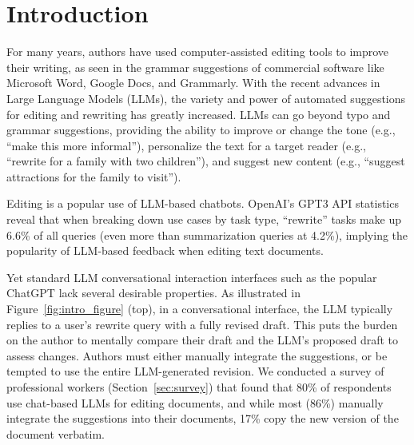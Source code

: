 \documentclass[manuscript]{acmart}
\begin{document}

\maketitle

\section{Introduction}

For many years, authors have used computer-assisted editing tools to improve their writing, as seen in the grammar suggestions of commercial software like Microsoft Word, Google Docs, and Grammarly. With the recent advances in Large Language Models (LLMs), the variety and power of automated suggestions for editing and rewriting has greatly increased. LLMs can go beyond typo and grammar suggestions, providing the ability to improve or change the tone (e.g., ``make this more informal''), personalize the text for a target reader (e.g., ``rewrite for a family with two children''), and suggest new content (e.g., ``suggest attractions for the family to visit''). 

Editing is a popular use of LLM-based chatbots. OpenAI's GPT3 API statistics \cite{ouyang2022training} reveal that when breaking down use cases by task type, ``rewrite'' tasks make up 6.6\% of all queries (even more than summarization queries at 4.2\%), implying the popularity of LLM-based feedback when editing text documents.

Yet standard LLM conversational interaction interfaces such as the popular ChatGPT lack several desirable properties. As illustrated in Figure~\ref{fig:intro_figure} (top), in a conversational interface, the LLM typically replies to a user's rewrite query with a fully revised draft.
This puts the burden on the author to mentally compare their draft and the LLM's proposed draft to assess changes. 
Authors must either manually integrate the suggestions, or be tempted to use the entire LLM-generated revision. %
We conducted a survey of professional workers (Section~\ref{sec:survey}) that found that 80\% of respondents use chat-based LLMs for editing documents, and while most (86\%) manually integrate the suggestions into their documents, 17\% copy the new version of the document verbatim.
\end{document}
